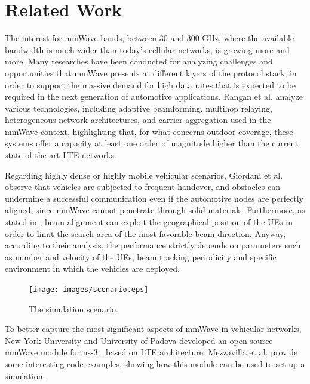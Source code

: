 \documentclass[conference,10pt]{IEEEtran}
\begin{document}
\section{Related Work}\label{sec:sota}

The interest for mmWave bands, between 30 and 300 GHz, where the available bandwidth is much wider than today's cellular networks, is growing more and more. Many researches have been conducted for analyzing challenges and opportunities that mmWave presents at different layers of the protocol stack, in order to support the massive demand for high data rates that is expected to be required in the next generation of automotive applications.
Rangan et al. \cite{mmwpac} analyze various technologies, including adaptive beamforming, multihop relaying, heterogeneous network architectures, and carrier aggregation used in the mmWave context, highlighting that, for what concerns outdoor coverage, these systems offer a capacity at least one order of magnitude higher than the current state of the art LTE networks.

Regarding highly dense or highly mobile vehicular scenarios, Giordani et al. \cite{mmvehicle} observe that vehicles are subjected to frequent handover, and obstacles can undermine a successful communication even if the automotive nodes are perfectly aligned, since mmWave cannot penetrate through solid materials. Furthermore, as stated in \cite{mmwvehcom}, beam alignment can exploit the geographical position of the UEs in order to limit the search area of the most favorable beam direction. Anyway, according to their analysis, the performance strictly depends on parameters such as number and velocity of the UEs, beam tracking periodicity and specific environment in which the vehicles are deployed.

\begin{figure}[ht]
	\begin{center}    
		\texttt{[image: images/scenario.eps]}
		\label{fig:scenario}
	\end{center}
	\vspace*{-6.5pt}
	\caption{The simulation scenario.}
	\vspace*{-6.5pt}
\end{figure}

To better capture the most significant aspects of mmWave in vehicular networks, New York University and University of Padova developed an open source mmWave module for ns-3 \cite{mmwmodule}, based on LTE architecture. Mezzavilla et al. \cite{e2esim} provide some interesting code examples, showing how this module can be used to set up a simulation.
\end{document}
